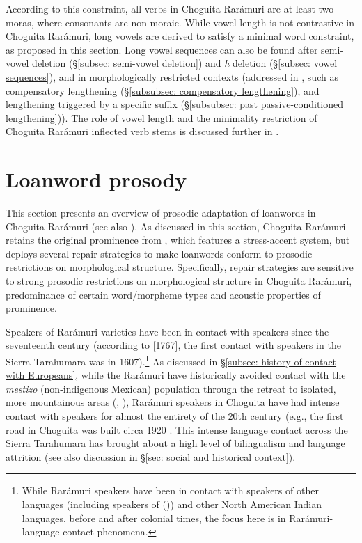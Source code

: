 According to this constraint, all verbs in Choguita Rarámuri are at least two moras, where consonants are non-moraic. While vowel length is not contrastive in Choguita Rarámuri, long vowels are derived to satisfy a minimal word constraint, as proposed in this section. Long vowel sequences can also be found after semi-vowel deletion (§\ref{subsec: semi-vowel deletion}) and \textit{h} deletion (§\ref{subsec: vowel sequences}), and in morphologically restricted contexts (addressed in , such as compensatory lengthening (§\ref{subsubsec: compensatory lengthening}), and lengthening triggered by a specific suffix (§\ref{subsubsec: past passive-conditioned lengthening})). The role of vowel length and the minimality restriction of Choguita Rarámuri inflected verb stems is discussed further in .

\section{Loanword prosody}
\label{sec: loanword prosody}

This section presents an overview of prosodic adaptation of  loanwords in Choguita Rarámuri (see also \citealt{caballero2013procesos}). As discussed in this section, Choguita Rarámuri retains the original prominence from , which features a stress-accent system, but deploys several repair strategies to make loanwords conform to  prosodic restrictions on morphological structure. Specifically, repair strategies are sensitive to strong prosodic restrictions on morphological structure in Choguita Rarámuri, predominance of certain word/morpheme types and acoustic properties of  prominence.

Speakers of Rarámuri varieties have been in contact with  speakers since the seventeenth century (according to \citet{alegre1956historia}[1767], the first contact with  speakers in the Sierra Tarahumara was in 1607).\footnote{While Rarámuri speakers have been in contact  with speakers of other  languages (including speakers of  ()) and other North American Indian languages, before and after colonial times, the focus here is in Rarámuri- language contact phenomena.} As discussed in §\ref{subsec: history of contact with Europeans}, while the Rarámuri have historically avoided contact with the \textit{mestizo} (non-indigenous Mexican) population through the retreat to isolated, more mountainous areas (\citealt{merrill2014ralamuli}, \citealt{cortina2012hijos}), Rarámuri speakers in Choguita have had intense contact with  speakers for almost the entirety of the 20th century (e.g., the first road in Choguita was built  circa 1920 \parencite{casaus2008quantitative}. This intense language contact across the Sierra Tarahumara has brought about a high level of bilingualism and language attrition (see also discussion in §\ref{sec: social and historical context}).

